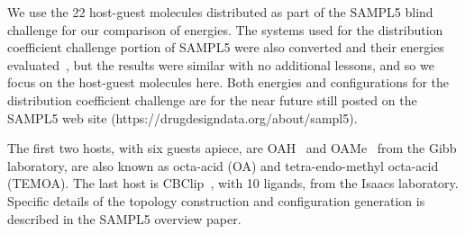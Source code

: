 We use the 22 host-guest molecules distributed as part of the SAMPL5
blind challenge for our comparison of energies.  The systems used for
the distribution coefficient challenge portion of SAMPL5 were also
converted and their energies evaluated~\citep{SAMPL5_DC_Overview}, but
the results were similar with no additional lessons, and so we focus
on the host-guest molecules here.  Both energies and configurations
for the distribution coefficient challenge are for the near future
still posted on the SAMPL5 web site
(https://drugdesigndata.org/about/sampl5). 


The first two hosts, with six guests apiece, are
OAH~\citep{gibb_binding_2013} and
OAMe~\citep{gan_guest-mediated_2013,jordan_molecular_2014} from the
Gibb laboratory, are also known as octa-acid (OA) and
tetra-endo-methyl octa-acid (TEMOA). The last host is
CBClip~\citep{zhang_acyclic_2014}, with 10 ligands, from the Isaacs
laboratory. Specific details of the topology construction and
configuration generation is described in the SAMPL5 overview
paper.~\citep{SAMPL5Overview}


